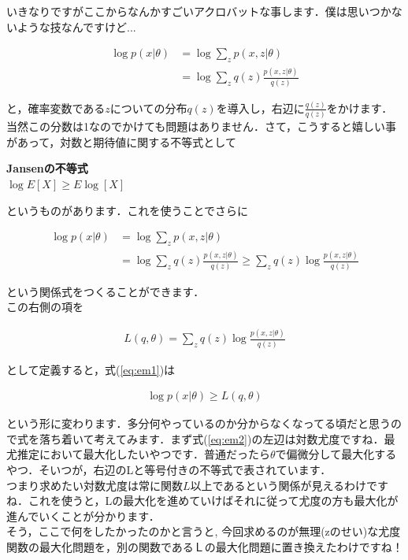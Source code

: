 \documentclass[11pt,a4paper]{ujreport}
\begin{document}
いきなりですがここからなんかすごいアクロバットな事します．僕は思いつかないような技なんですけど...

\begin{align}
  \log p(x|\theta) &= \log \sum_z p(x,z|\theta)\\
  &= \log \sum_z q(z) \frac{p(x,z|\theta)}{q(z)} 
\end{align}

と，確率変数である$z$についての分布$q(z)$を導入し，右辺に$\frac{q(z)}{q(z)}$をかけます．当然この分数は1なのでかけても問題はありません．さて，こうすると嬉しい事があって，対数と期待値に関する不等式として  

\begin{screen}
  \textbf{Jansenの不等式}\\
  $\log E[X] \geq E \log[X]$
\end{screen}

というものがあります．これを使うことでさらに

\begin{align}
  \log p(x|\theta) &= \log \sum_z p(x,z|\theta)\\
  &= \log \sum_z q(z) \frac{p(x,z|\theta)}{q(z)} \geq \sum_z q(z) \log \frac{p(x,z|\theta)}{q(z)}
\end{align}

という関係式をつくることができます．\\
この右側の項を

\begin{align}
  L(q,\theta) = \sum_z q(z) \log \frac{p(x,z|\theta)}{q(z)}
\end{align}

として定義すると，式(\ref{eq:em1})は

\begin{align}
  \label{eq:em2}
  \log p(x|\theta) \geq L(q,\theta)
\end{align}

という形に変わります．多分何やっているのか分からなくなってる頃だと思うので式を落ち着いて考えてみます．まず式(\ref{eq:em2})の左辺は対数尤度ですね．最尤推定において最大化したいやつです．普通だったら$\theta$で偏微分して最大化するやつ．そいつが，右辺のLと等号付きの不等式で表されています．\\

つまり求めたい対数尤度は常に関数$L$以上であるという関係が見えるわけですね．これを使うと，Lの最大化を進めていけばそれに従って尤度の方も最大化が進んでいくことが分かります．\\

そう，ここで何をしたかったのかと言うと, 今回求めるのが無理(zのせい)な尤度関数の最大化問題を，別の関数であるＬの最大化問題に置き換えたわけですね！\\
\end{document}
